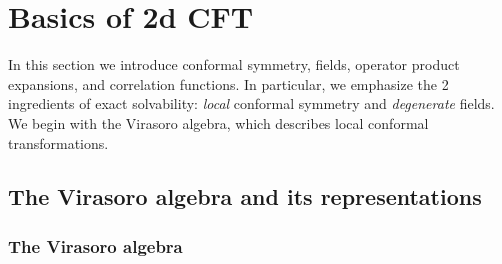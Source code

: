 \documentclass[12pt, a4paper]{article}
\begin{document}
\section{Basics of 2d CFT}\label{sec:bo}

In this section we introduce conformal symmetry, fields, operator product expansions, and correlation functions. In particular, we emphasize the 2 ingredients of exact solvability: \textit{local} conformal symmetry and \textit{degenerate} fields. We begin with the Virasoro algebra, which describes local conformal transformations. 

\subsection{The Virasoro algebra and its representations}\label{sec:vir}

\subsubsection{The Virasoro algebra}
\end{document}
